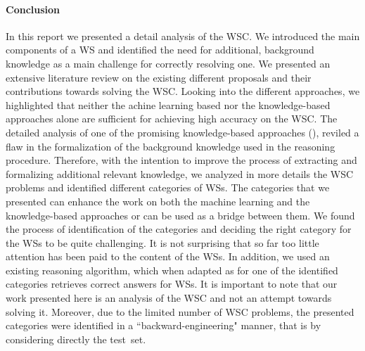 
\paragraph{Conclusion}
In this report we presented a detail analysis of the WSC. We introduced the main components of a WS and identified the need for additional, background knowledge as a main challenge for correctly resolving one. We presented an extensive literature review on the existing different proposals and their contributions towards solving the WSC. Looking into the different approaches, we highlighted that neither the achine learning based nor the knowledge-based approaches alone are sufficient for achieving high accuracy on the WSC. The detailed analysis of one of the promising knowledge-based approaches (\cite{2018CommonsenseKT}), reviled a flaw in the formalization of the background knowledge used in the reasoning procedure. Therefore, with the intention to improve the process of extracting and formalizing additional relevant knowledge, we analyzed in more details the WSC problems and identified different categories of WSs. The categories that we presented can enhance the work on both the machine learning and the knowledge-based approaches or can be used as a bridge between them. We found the process of identification of the categories and deciding the right category for the WSs to be quite challenging. It is not surprising that so far too little attention has been paid to the content of the WSs. In addition, we used an existing reasoning algorithm, which when adapted as for one of the identified categories retrieves correct answers for WSs. 
It is important to note that our work presented here is an analysis of the WSC and not an attempt towards solving it. Moreover, due to the limited number of WSC problems, the presented categories were identified in a ``backward-engineering" manner, that is by considering directly the test~set. 

